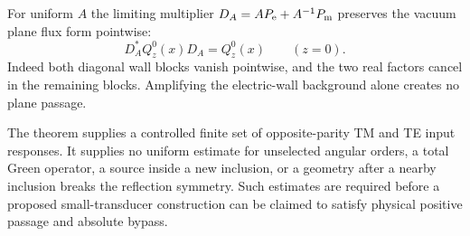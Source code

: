 \begin{remark}
\label{cd:scope}
For uniform $A$ the limiting multiplier
$D_A=A P_{\rm e}+A^{-1}P_{\rm m}$ preserves the vacuum plane
flux form pointwise:
\begin{equation}\label{cd:flux-cancel}
 D_A^*Q_z^0(x)D_A=Q_z^0(x)\qquad(z=0).
\end{equation}
Indeed both diagonal wall blocks vanish pointwise, and the two
real factors cancel in the remaining blocks. Amplifying the
electric-wall background alone creates no plane passage.

The theorem supplies a controlled finite set of opposite-parity
TM and TE input responses. It supplies no uniform estimate for
unselected angular orders, a total Green operator, a source
inside a new inclusion, or a geometry after a nearby inclusion
breaks the reflection symmetry. Such estimates are required
before a proposed small-transducer construction can be claimed
to satisfy physical positive passage and absolute bypass.
\end{remark}
